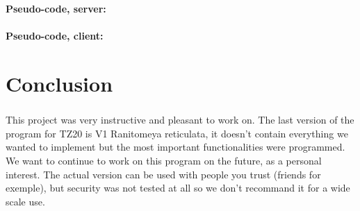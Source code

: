 \documentclass[12pt,a4paper,twoside]{article}
\begin{document}
			\paragraph*{Pseudo-code, server:}
				
				
			\paragraph*{Pseudo-code, client:}
				
				
	\section{Conclusion} %
		\subparagraph*{}
			This project was very instructive and pleasant to work on. The last version of the program for TZ20 is V1 Ranitomeya reticulata, it doesn’t contain everything we wanted to implement but the most important functionalities were programmed. We want to continue to work on this program on the future, as a personal interest. The actual version can be used with people you trust (friends for exemple), but security was not tested at all so we don't recommand it for a wide scale use.
\end{document}
